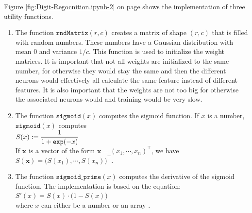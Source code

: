 Figure \ref{fig:Digit-Regocnition.ipynb-2} on page \pageref{fig:Digit-Regocnition.ipynb-2}
shows the implementation of three utility functions.
\begin{enumerate}
\item The function $\mathtt{rndMatrix}(r, c)$ creates a matrix of shape $(r, c)$ that is filled with
      random numbers.  These numbers have a Gaussian distribution with mean $0$ and variance
      $1/c$.  This function is used to initialize the weight matrices.  It is important that not all weights
      are initialized to the same number, for otherwise they would stay the same and then the different neurons
      would effectively all calculate the same feature instead of different features.  It is also important
      that the weights are not too big for otherwise the associated neurons would  and 
      training would be very slow.
\item The function $\texttt{sigmoid}(x)$ computes the sigmoid function.  If $x$ is a number,
      $\texttt{sigmoid}(x)$ computes
      \\[0.2cm]
      \hspace*{1.3cm}
      $\displaystyle S(x) := \frac{1}{1 + \texttt{exp}(-x)}$
      \\[0.2cm]
      If $\mathbf{x}$ is a vector of the form $\mathbf{x} = (x_1,\cdots, x_n)^\top$, we have
      \\[0.2cm]
      \hspace*{1.3cm}
      $S(\mathbf{x}) = \bigl(S(x_1), \cdots, S(x_n)\bigr)^\top$.
\item The function $\texttt{sigmoid\_prime}(x)$ computes the derivative of the sigmoid function.
      The implementation is based on the equation:
      \\[0.2cm]
      \hspace*{1.3cm}
      $S'(x) = S(x) \cdot \bigl(1 - S(x)\bigr)$
      \\[0.2cm]
      where $x$ can either be a number or an array
      .
\end{enumerate}


